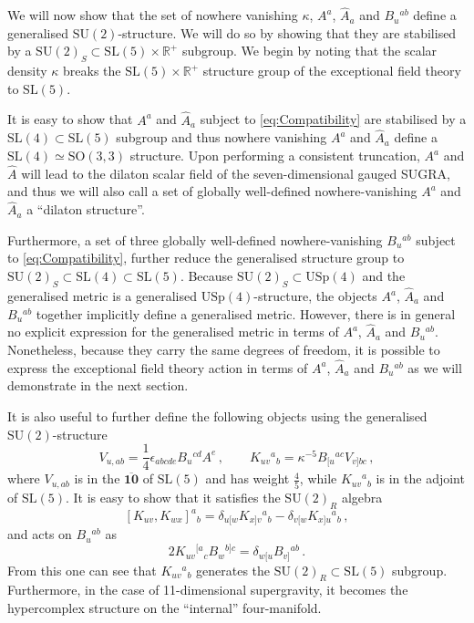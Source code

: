 \documentclass{PoS}
\newcommand{\SU}[1]{\mathrm{SU}( #1 )}
\newcommand{\SL}[1]{\mathrm{SL}( #1 )}
\newcommand{\SO}[1]{\mathrm{SO}( #1 )}
\newcommand{\USp}[1]{\mathrm{USp}(#1)}
\newcommand{\obf}[1]{\overline{\mathbf{#1}}}
\newcommand{\hA}{\hat{A}}
\begin{document}
We will now show that the set of nowhere vanishing $\kappa$, $A^a$, $\hA_a$ and $B_u{}^{ab}$ define a generalised $\SU{2}$-structure. We will do so by showing that they are stabilised by a $\SU{2}_S \subset \SL{5} \times \mathbb{R}^+$ subgroup. We begin by noting that the scalar density $\kappa$ breaks the $\SL{5} \times \mathbb{R}^+$ structure group of the exceptional field theory to $\SL{5}$.

It is easy to show that $A^a$ and $\hat{A}_a$ subject to \eqref{eq:Compatibility} are stabilised by a $\SL{4} \subset \SL{5}$ subgroup and thus nowhere vanishing $A^a$ and $\hat{A}_a$ define a $\SL{4} \simeq \SO{3,3}$ structure. Upon performing a consistent truncation, $A^a$ and $\hat{A}$ will lead to the dilaton scalar field of the seven-dimensional gauged SUGRA, and thus we will also call a set of globally well-defined nowhere-vanishing $A^a$ and $\hat{A}_a$ a ``dilaton structure''.

Furthermore, a set of three globally well-defined nowhere-vanishing $B_u{}^{ab}$ subject to \eqref{eq:Compatibility}, further reduce the generalised structure group to $\SU{2}_S \subset \SL{4} \subset \SL{5}$. Because $\SU{2}_S \subset \USp{4}$ and the generalised metric is a generalised $\USp{4}$-structure, the objects $A^a$, $\hat{A}_a$ and $B_u{}^{ab}$ together implicitly define a generalised metric. However, there is in general no explicit expression for the generalised metric in terms of $A^a$, $\hat{A}_a$ and $B_u{}^{ab}$. Nonetheless, because they carry the same degrees of freedom, it is possible to express the exceptional field theory action in terms of $A^a$, $\hat{A}_a$ and $B_u{}^{ab}$ as we will demonstrate in the next section.

It is also useful to further define the following objects using the generalised $\SU{2}$-structure
\begin{equation}
 V_{u,ab} = \frac14 \epsilon_{abcde} B_u{}^{cd} A^e \,, \qquad K_{uv}{}^a{}_b = \kappa^{-5} B_{[u}{}^{ac} V_{v]bc} \,,
\end{equation}
where $V_{u,ab}$ is in the $\obf{10}$ of $\SL{5}$ and has weight $\frac45$, while $K_{uv}{}^a{}_b$ is in the adjoint of $\SL{5}$. It is easy to show that it satisfies the $\SU{2}_R$ algebra
\begin{equation}
 \left[ K_{uv}, K_{wx} \right]^a{}_b = \delta_{u[w} K_{x]v}{}^a{}_b - \delta_{v[w} K_{x]u}{}^a{}_b \,,
\end{equation}
and acts on $B_u{}^{ab}$ as
\begin{equation}
 2 K_{uv}{}^{[a}{}_c B_{w}{}^{b]c} = \delta_{w[u} B_{v]}{}^{ab} \,.
\end{equation}
From this one can see that $K_{uv}{}^a{}_b$ generates the $\SU{2}_R \subset \SL{5}$ subgroup. Furthermore, in the case of 11-dimensional supergravity, it becomes the hypercomplex structure on the ``internal'' four-manifold.
\end{document}
